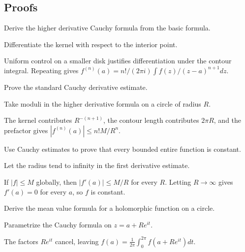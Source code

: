 \subsection*{Proofs}

\begin{exercise}\label{exr:iv06-expand-06}
Derive the higher derivative Cauchy formula from the basic formula.
\end{exercise}
\begin{hint}
Differentiate the kernel with respect to the interior point.
\end{hint}
\begin{solution}
Uniform control on a smaller disk justifies differentiation under the contour integral. Repeating gives \(f^{(n)}(a)=n!/(2\pi i)\int f(z)/(z-a)^{n+1}dz\).
\end{solution}

\begin{exercise}\label{exr:iv06-expand-07}
Prove the standard Cauchy derivative estimate.
\end{exercise}
\begin{hint}
Take moduli in the higher derivative formula on a circle of radius \(R\).
\end{hint}
\begin{solution}
The kernel contributes \(R^{-(n+1)}\), the contour length contributes \(2\pi R\), and the prefactor gives \(|f^{(n)}(a)|\le n!M/R^n\).
\end{solution}

\begin{exercise}\label{exr:iv06-expand-08}
Use Cauchy estimates to prove that every bounded entire function is constant.
\end{exercise}
\begin{hint}
Let the radius tend to infinity in the first derivative estimate.
\end{hint}
\begin{solution}
If \(|f|\le M\) globally, then \(|f'(a)|\le M/R\) for every \(R\). Letting \(R\to\infty\) gives \(f'(a)=0\) for every \(a\), so \(f\) is constant.
\end{solution}

\begin{exercise}\label{exr:iv06-expand-09}
Derive the mean value formula for a holomorphic function on a circle.
\end{exercise}
\begin{hint}
Parametrize the Cauchy formula on \(z=a+Re^{it}\).
\end{hint}
\begin{solution}
The factors \(Re^{it}\) cancel, leaving \(f(a)=\frac1{2\pi}\int_0^{2\pi}f(a+Re^{it})dt\).
\end{solution}


